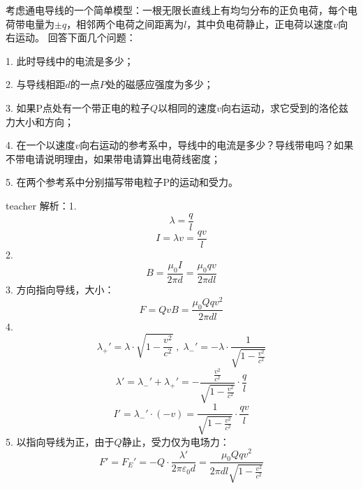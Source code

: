 \begin{example}

考虑通电导线的一个简单模型：一根无限长直线上有均匀分布的正负电荷，每个电荷带电量为$\pm q$，相邻两个电荷之间距离为$l$，其中负电荷静止，正电荷以速度$v$向右运动。
回答下面几个问题：

1. 此时导线中的电流是多少；

2. 与导线相距$d$的一点$P$处的磁感应强度为多少；

3. 如果P点处有一个带正电的粒子$Q$以相同的速度$v$向右运动，求它受到的洛伦兹力大小和方向；

4. 在一个以速度$v$向右运动的参考系中，导线中的电流是多少？导线带电吗？如果不带电请说明理由，如果带电请算出电荷线密度；

5. 在两个参考系中分别描写带电粒子P的运动和受力。

\begin{taggedblock}{teacher}
\noindent
解析：1. 
\[\lambda = \frac{q}{l}\]
\[I=\lambda v=\frac{qv}{l}\]
2. \[B=\frac{\mu_0 I}{2\pi d}=\frac{\mu_0 qv}{2\pi dl}\]
3. 方向指向导线，大小：
\[F=QvB=\frac{\mu_0 Qqv^2}{2\pi dl}\]
4. \[\lambda_+'=\lambda \cdot \sqrt{1-\frac{v^2}{c^2}}\; , \; \lambda_-'=-\lambda\cdot \frac{1}{\sqrt{1-\frac{v^2}{c^2}}}\]
\[\lambda'=\lambda_-'+\lambda_+'=-\frac{\frac{v^2}{c^2}}{\sqrt{1-\frac{v^2}{c^2}}}\cdot \frac{q}{l}\]
\[I'=\lambda_-'\cdot(-v)=\frac{1}{\sqrt{1-\frac{v^2}{c^2}}}\cdot\frac{qv}{l}\]
5. 以指向导线为正，由于$Q$静止，受力仅为电场力：
\[F'=F_E'=-Q\cdot \frac{\lambda'}{2\pi\varepsilon_0 d}=\frac{\mu_0 Qqv^2}{2\pi dl\sqrt{1-\frac{v^2}{c^2}}}\]
\end{taggedblock}
\end{example}




